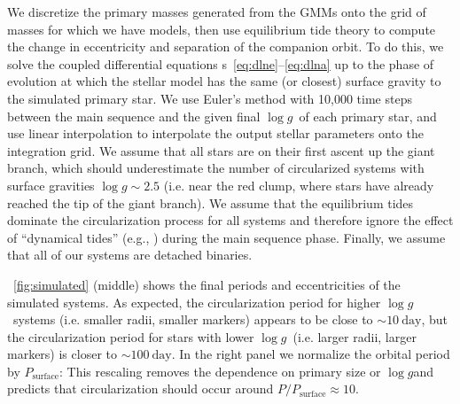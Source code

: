 \documentclass[modern, letterpaper]{aastex62}
\newcommand{\logg}{\ensuremath{\log g}}
\newcommand{\Psurf}{\ensuremath{P_\textrm{surface}}}
\begin{document}
We discretize the primary masses generated from the GMMs onto the grid of masses
for which we have  models, then use equilibrium tide theory to
compute the change in eccentricity and separation of the companion orbit.
To do this, we solve the coupled differential equations \eqname
s~\ref{eq:dlne}--\ref{eq:dlna} up to the phase of evolution at which the stellar
model has the same (or closest) surface gravity to the simulated primary star.
We use Euler's method with 10,000 time steps between the main sequence and the
given final \logg\ of each primary star, and use linear interpolation to
interpolate the  output stellar parameters onto the integration
grid.
We assume that all stars are on their first ascent up the giant branch, which
should underestimate the number of circularized systems with surface gravities
$\logg \sim 2.5$ (i.e. near the red clump, where stars have already reached the
tip of the giant branch).
We assume that the equilibrium tides dominate the circularization process for
all systems and therefore ignore the effect of ``dynamical tides''
(e.g., \citealt{Goodman:1998}) during the main sequence phase.
Finally, we assume that all of our systems are detached binaries.

\figurename~\ref{fig:simulated} (middle) shows the final periods and
eccentricities of the simulated systems.
As expected, the circularization period for higher \logg\ systems (i.e. smaller
radii, smaller markers) appears to be close to $\sim 10~\textrm{day}$, but the
circularization period for stars with lower \logg\ (i.e. larger radii, larger
markers) is closer to $\sim 100~\textrm{day}$.
In the right panel we normalize the orbital period by \Psurf:
This rescaling removes the dependence on primary size or \logg and predicts that
circularization should occur around $P / \Psurf \approx 10$.
\end{document}
